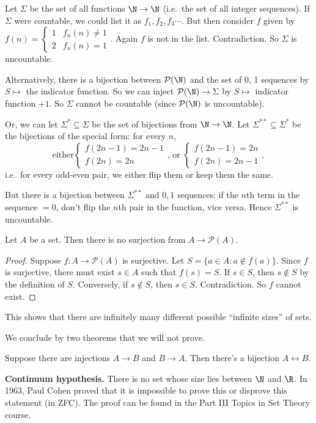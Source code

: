 \documentclass[a4paper]{article}
\begin{document}
\begin{eg}
  Let $\Sigma$ be the set of all functions $\N\to \N$ (i.e.\ the set of all integer sequences). If $\Sigma$ were countable, we could list it as $f_1, f_2, f_3\cdots$. But then consider $f$ given by $f(n) =
  \begin{cases}
    1 & f_n(n) \not= 1\\
    2 & f_n(n) = 1
  \end{cases}$. Again $f$ is not in the list. Contradiction. So $\Sigma$ is uncountable.

  Alternatively, there is a bijection between $\mathcal{P}(\N)$ and the set of 0, 1 sequences by $S\mapsto$ the indicator function. So we can inject $\mathcal{P}(\N) \to \Sigma$ by $S\mapsto $ indicator function $+1$. So $\Sigma$ cannot be countable (since $\mathcal{P}(\N)$ is uncountable).

  Or, we can let $\Sigma^*\subseteq \Sigma$ be the set of bijections from $\N\to\N$. Let $\Sigma^{**}\subseteq \Sigma^*$ be the bijections of the special form: for every $n$,
  \[
    \text{either}
    \begin{cases}
      f(2n - 1) = 2n - 1\\
      f(2n) = 2n
    \end{cases}\text{, or }
    \begin{cases}
      f(2n - 1) = 2n\\
      f(2n) = 2n - 1
    \end{cases},
  \]
  i.e.\ for every odd-even pair, we either flip them or keep them the same.

  But there is a bijection between $\Sigma^{**}$ and $0,1$ sequences: if the $n$th term in the sequence $ = 0$, don't flip the $n$th pair in the function, vice versa. Hence $\Sigma^{**}$ is uncountable.
\end{eg}

\begin{thm}
  Let $A$ be a set. Then there is no surjection from $A\to \mathcal{P}(A)$.
\end{thm}

\begin{proof}
  Suppose $f: A\to \mathcal{P}(A)$ is surjective. Let $S = \{a\in A: a\not\in f(a)\}$. Since $f$ is surjective, there must exist $s\in A$ such that $f(s) = S$. If $s\in S$, then $s\not\in S$ by the definition of $S$. Conversely, if $s\not\in S$, then $s\in S$. Contradiction. So $f$ cannot exist.
\end{proof}

This shows that there are infinitely many different possible ``infinite sizes'' of sets.

We conclude by two theorems that we will not prove.
\begin{thm}
  Suppose there are injections $A\to B$ and $B\to A$. Then there's a bijection $A\leftrightarrow B$.
\end{thm}

\noindent \textbf{Continuum hypothesis.} There is no set whose size lies between $\N$ and $\R$. In 1963, Paul Cohen proved that it is impossible to prove this or disprove this statement (in ZFC). The proof can be found in the Part III Topics in Set Theory course.
\end{document}
